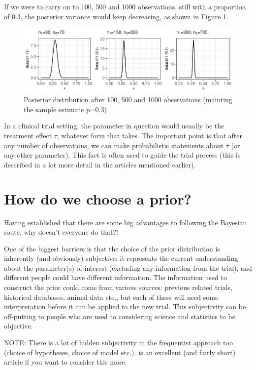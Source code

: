 \documentclass[
  openany]{book}
\theoremstyle{definition}
\theoremstyle{definition}
\theoremstyle{definition}
\theoremstyle{definition}
\theoremstyle{remark}
\begin{document}
If we were to carry on to 100, 500 and 1000 observations, still with a proportion of 0.3, the posterior variance would keep decreasing, as shown in Figure \ref{fig:betaplotmega}.

\begin{figure}
\centering
\includegraphics{CT4H_notes_files/figure-latex/betaplotmega-1.pdf}
\caption{\label{fig:betaplotmega}Posterior distribution after 100, 500 and 1000 observations (mainting the sample estimate p=0.3)}
\end{figure}

In a clinical trial setting, the parameter in question would usually be the treatment effect \(\tau\), whatever form that takes. The important point is that after any number of observations, we can make probabilistic statements about \(\tau\) (or any other parameter). This fact is often used to guide the trial process (this is described in a lot more detail in the articles mentioned earlier).

\section{How do we choose a prior?}\label{how-do-we-choose-a-prior}

Having established that there are some big advantages to following the Bayesian route, why doesn't everyone do that?!

One of the biggest barriers is that the choice of the prior distribution is inherently (and obviously) subjective: it represents the current understanding about the parameter(s) of interest (excluding any information from the trial), and different people could have different information. The information used to construct the prior could come from various sources: previous related trials, historical databases, animal data etc., but each of these will need some interpretation before it can be applied to the new trial. This subjectivity can be off-putting to people who are used to considering science and statistics to be objective.

NOTE: There is a lot of hidden subjectivity in the frequentist approach too (choice of hypotheses, choice of model etc.). \citet{berger1988statistical} is an excellent (and fairly short) article if you want to consider this more.
\end{document}
